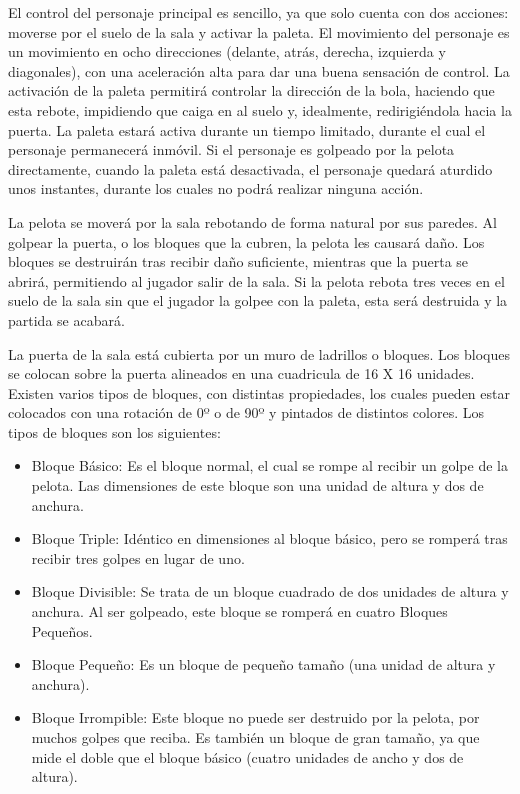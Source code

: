 El control del personaje principal es sencillo, ya que solo cuenta con dos acciones: moverse por el suelo de la sala y activar la paleta. El movimiento del personaje es un movimiento en ocho direcciones (delante, atrás, derecha, izquierda y diagonales), con una aceleración alta para dar una buena sensación de control. La activación de la paleta permitirá controlar la dirección de la bola, haciendo que esta rebote, impidiendo que caiga en al suelo y, idealmente, redirigiéndola hacia la puerta. La paleta estará activa durante un tiempo limitado, durante el cual el personaje permanecerá inmóvil. Si el personaje es golpeado por la pelota directamente, cuando la paleta está desactivada, el personaje quedará aturdido unos instantes, durante los cuales no podrá realizar ninguna acción.

La pelota se moverá por la sala rebotando de forma natural por sus paredes. Al golpear la puerta, o los bloques que la cubren, la pelota les causará daño. Los bloques se destruirán tras recibir daño suficiente, mientras que la puerta se abrirá, permitiendo al jugador salir de la sala. Si la pelota rebota tres veces en el suelo de la sala sin que el jugador la golpee con la paleta, esta será destruida y la partida se acabará.

La puerta de la sala está cubierta por un muro de ladrillos o bloques. Los bloques se colocan sobre la puerta alineados en una cuadricula de 16 X 16 unidades. Existen varios tipos de bloques, con distintas propiedades, los cuales pueden estar colocados con una rotación de 0º o de 90º y pintados de distintos colores. Los tipos de bloques son los siguientes:
\begin{itemize}
  \item Bloque Básico: Es el bloque normal, el cual se rompe al recibir un golpe de la pelota. Las dimensiones de este bloque son una unidad de altura y dos de anchura.
  \item Bloque Triple: Idéntico en dimensiones al bloque básico, pero se romperá tras recibir tres golpes en lugar de uno. 
  \item Bloque Divisible: Se trata de un bloque cuadrado de dos unidades de altura y anchura. Al ser golpeado, este bloque se romperá en cuatro Bloques Pequeños. 
  \item Bloque Pequeño: Es un bloque de pequeño tamaño (una unidad de altura y anchura).
  \item Bloque Irrompible: Este bloque no puede ser destruido por la pelota, por muchos golpes que reciba. Es también un bloque de gran tamaño, ya que mide el doble que el bloque básico (cuatro unidades de ancho y dos de altura).
\end{itemize}

